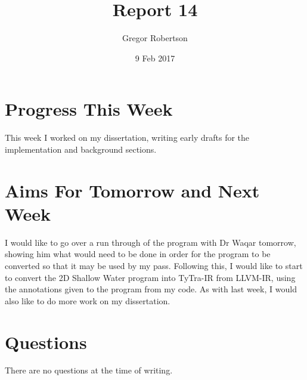 \documentclass{article}
\title{Report 14}
\author{Gregor Robertson}
\date{9 Feb 2017}
\begin{document}
 
\maketitle
 
\section*{Progress This Week}
This week I worked on my dissertation, writing early drafts for the implementation and background sections. 

\section*{Aims For Tomorrow and Next Week}
I would like to go over a run through of the program with Dr Waqar tomorrow, showing him what would need to be done in order for the program to be converted so that it may be used by my pass. Following this, I would like to start to convert the 2D Shallow Water program into TyTra-IR from LLVM-IR, using the annotations given to the program from my code. As with last week, I would also like to do more work on my dissertation. 

\section*{Questions}
There are no questions at the time of writing.
\medskip
 
\printbibliography
\end{document}
